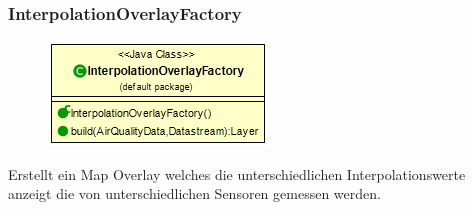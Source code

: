 \subsubsection{InterpolationOverlayFactory}
\begin{minipage}{0.3\textwidth}
    \begin{figure}[H]
        \includegraphics[scale = 0.5
        ]{media/view/factory/InterpolationOverlayFactory_Class.png}
    \end{figure}
    \end{minipage} \hfill
    \begin{minipage}{0.6\textwidth}
Erstellt ein Map Overlay welches die unterschiedlichen Interpolationswerte anzeigt die von unterschiedlichen Sensoren gemessen werden.
\end{minipage}
